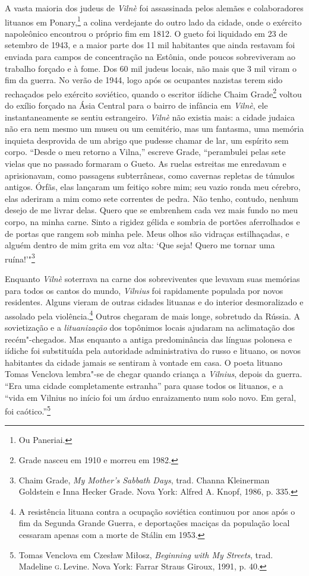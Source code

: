 A vasta maioria dos judeus de \textit{Vilnè} foi assassinada pelos alemães e
colaboradores lituanos em Ponary,\footnote{Ou Paneriai.} a colina verdejante do
outro lado da cidade, onde o exército napoleônico encontrou o próprio
fim em 1812. O gueto foi liquidado em 23 de setembro de 1943, e a maior
parte dos 11 mil habitantes que ainda restavam foi enviada para campos
de concentração na Estônia, onde poucos sobreviveram ao trabalho forçado
e à fome. Dos 60 mil judeus locais, não mais que 3 mil viram o
fim da guerra. No verão de 1944, logo após os ocupantes nazistas terem
sido rechaçados pelo exército soviético, quando o escritor iídiche Chaim
Grade\footnote{Grade nasceu em 1910 e morreu em 1982.} voltou do exílio forçado na Ásia Central para o bairro
de infância em \textit{Vilnè}, ele instantaneamente se sentiu estrangeiro. \textit{Vilnè}
não existia mais: a cidade judaica não era nem mesmo um museu ou um
cemitério, mas um fantasma, uma memória inquieta desprovida de um abrigo
que pudesse chamar de lar, um espírito sem corpo. ``Desde o meu retorno
a Vilna,'' escreve Grade, ``perambulei pelas sete vielas que no passado
formaram o Gueto. As ruelas estreitas me enredavam e aprisionavam, como
passagens subterrâneas, como cavernas repletas de túmulos antigos.
Órfãs, elas lançaram um feitiço sobre mim; seu vazio ronda meu cérebro,
elas aderiram a mim como sete correntes de pedra. Não tenho, contudo,
nenhum desejo de me livrar delas. Quero que se embrenhem cada vez mais
fundo no meu corpo, na minha carne. Sinto a rigidez gélida e sombria de
portões aferrolhados e de portas que rangem sob minha pele. Meus olhos
são vidraças estilhaçadas, e alguém dentro de mim grita em voz alta:
`Que seja! Quero me tornar uma ruína!'"\footnote{Chaim Grade, \textit{My Mother's Sabbath Days}, trad. Channa Kleinerman Goldstein e Inna Hecker Grade. Nova York: Alfred A. Knopf, 1986, p. 335.}

Enquanto \textit{Vilnè} soterrava na carne dos sobreviventes que levavam suas
memórias para todos os cantos do mundo, \textit{Vilnius} foi rapidamente populada
por novos residentes. Alguns vieram de outras cidades lituanas e do
interior desmoralizado e assolado pela violência.\footnote{A resistência lituana
contra a ocupação soviética continuou por anos após o fim da Segunda
Grande Guerra, e deportações maciças da população local cessaram apenas
com a morte de Stálin em 1953.} Outros chegaram de mais longe, sobretudo
da Rússia. A sovietização e a \textit{lituanização} dos topônimos locais ajudaram
na aclimatação dos recém"-chegados. Mas enquanto a antiga predominância
das línguas polonesa e iídiche foi substituída pela autoridade
administrativa do russo e lituano, os novos habitantes da cidade jamais
se sentiram à vontade em casa. O poeta lituano Tomas Venclova lembra"-se
de chegar quando criança a \textit{Vilnius}, depois da guerra. ``Era uma cidade
completamente estranha'' para quase todos os lituanos, e a ``vida em
Vilnius no início foi um árduo enraizamento num solo novo. Em geral, foi
caótico.''\footnote{Tomas Venclova em Czesław Miłosz, \textit{Beginning with My Streets}, trad. Madeline \textsc{g}.\,Levine. Nova York: Farrar Straus Giroux, 1991, p. 40.}

